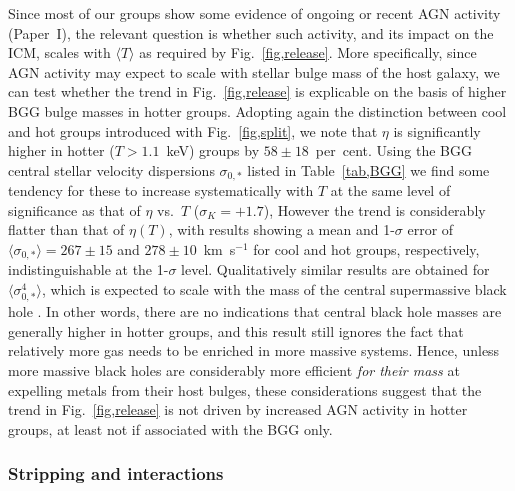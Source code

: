 \documentclass[useAMS,usenatbib]{mn2e}
\begin{document}
Since most of our groups show some evidence of ongoing or recent AGN
activity (Paper~I), the relevant question is whether such activity,
and its impact on the ICM, scales with $\langle T\rangle$ as required
by Fig.~\ref{fig,release}. More specifically, since AGN activity may
expect to scale with stellar bulge mass of the host galaxy, we can
test whether the trend in Fig.~\ref{fig,release} is explicable on the
basis of higher BGG bulge masses in hotter groups. Adopting again the
distinction between cool and hot groups introduced with
Fig.~\ref{fig,split}, we note that $\eta$ is significantly higher in
hotter ($T>1.1$~keV) groups by $58 \pm 18$~per~cent. Using the BGG
central stellar velocity dispersions $\sigma_{0,\ast}$ listed in
Table~\ref{tab,BGG} we find some tendency for these to increase
systematically with $T$ at the same level of significance as that of
$\eta$ vs.\ $T$ ($\sigma_K=+1.7$), However the trend is considerably
flatter than that of $\eta(T)$, with results showing a mean and
1-$\sigma$ error of $\langle \sigma_{0,\ast} \rangle = 267\pm 15$ and
$278 \pm 10$~km~s$^{-1}$ for cool and hot groups, respectively,
indistinguishable at the 1-$\sigma$ level. Qualitatively similar
results are obtained for $\langle \sigma_{0,\ast} ^4 \rangle$, which
is expected to scale with the mass of the central supermassive black
hole \citep{ferr00,gebh00}. In other words, there are no indications
that central black hole masses are generally higher in hotter groups,
and this result still ignores the fact that relatively more gas needs
to be enriched in more massive systems. Hence, unless more massive
black holes are considerably more efficient {\em for their mass} at
expelling metals from their host bulges, these considerations suggest
that the trend in Fig.~\ref{fig,release} is not driven by increased
AGN activity in hotter groups, at least not if associated with the BGG
only.







\subsubsection{Stripping and interactions}
\end{document}
